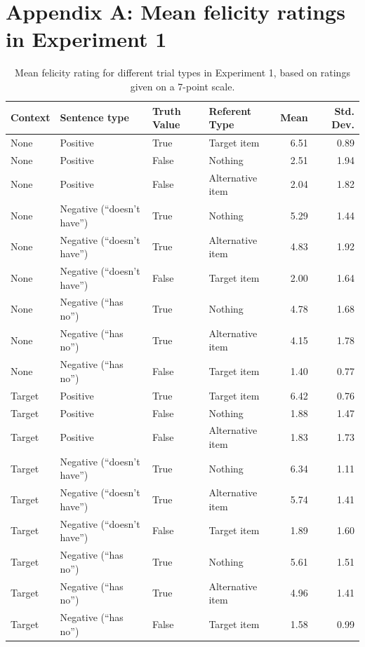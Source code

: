 \documentclass[man, noapacite]{apa2}
\begin{document}
\newpage
\theappendix

\section{Appendix A: Mean felicity ratings in Experiment 1}\label{appendix:exp1}

\begin{table}[h!]
\caption{\label{tab:m1} Mean felicity rating for different trial types in Experiment 1, based on ratings given on a 7-point scale.}
\begin{center}
\small\addtolength{\tabcolsep}{-5pt}
\begin{tabular}{llllrr}
 \hline
 Context & Sentence type & Truth Value & Referent Type & Mean & Std. Dev. \\
 \hline
 None & Positive & True & Target item & 6.51 & 0.89\\
 None & Positive & False & Nothing & 2.51 & 1.94\\
 None & Positive & False & Alternative item & 2.04 & 1.82\\
 None & Negative (``doesn't have'') & True & Nothing & 5.29 & 1.44\\
 None & Negative (``doesn't have'') & True & Alternative item & 4.83 & 1.92\\
 None & Negative (``doesn't have'') & False & Target item & 2.00 & 1.64\\
 None & Negative (``has no'') & True & Nothing & 4.78 & 1.68\\
 None & Negative (``has no'') & True & Alternative item & 4.15 & 1.78\\
 None & Negative (``has no'') & False & Target item & 1.40 & 0.77\\
 Target & Positive & True & Target item & 6.42 & 0.76\\
 Target& Positive & False & Nothing & 1.88 & 1.47\\
 Target & Positive & False & Alternative item & 1.83 & 1.73\\
 Target & Negative (``doesn't have'') & True & Nothing & 6.34 & 1.11\\
 Target & Negative (``doesn't have'') & True & Alternative item & 5.74 & 1.41\\
 Target & Negative (``doesn't have'') & False & Target item & 1.89 & 1.60\\
 Target & Negative (``has no'') & True & Nothing & 5.61 & 1.51\\
 Target & Negative (``has no'') & True & Alternative item & 4.96 & 1.41\\
 Target & Negative (``has no'') & False & Target item & 1.58 & 0.99\\
  \hline
\end{tabular}
\end{center}
\end{table}
\end{document}
